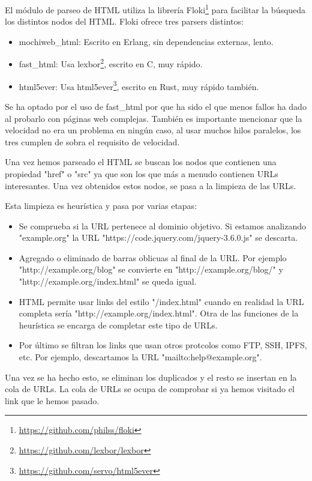 El módulo de parseo de HTML utiliza la librería Floki\footnote{\url{https://github.com/philss/floki}} para facilitar la búsqueda los distintos nodos del HTML. Floki ofrece tres parsers distintos:

\begin{itemize}
  \item mochiweb\_html: Escrito en Erlang, sin dependencias externas, lento.
  \item fast\_html: Usa lexbor\footnote{\url{https://github.com/lexbor/lexbor}}, escrito en C, muy rápido.
  \item html5ever: Usa html5ever\footnote{\url{https://github.com/servo/html5ever}}, escrito en Rust, muy rápido también.
\end{itemize}

Se ha optado por el uso de fast\_html por que ha sido el que menos fallos ha dado al probarlo con páginas web complejas. También es importante mencionar que la velocidad no era un problema en ningún caso, al usar muchos hilos paralelos, los tres cumplen de sobra el requisito de velocidad.

Una vez hemos parseado el HTML se buscan los nodos que contienen una propiedad "href" o "src" ya que son los que más a menudo contienen URLs interesantes. Una vez obtenidos estos nodos, se pasa a la limpieza de las URLs.

Esta limpieza es heurística y pasa por varias etapas:

\begin{itemize}
  \item Se comprueba si la URL pertenece al dominio objetivo. Si estamos analizando "example.org" la URL "https://code.jquery.com/jquery-3.6.0.js" se descarta.
  \item Agregado o eliminado de barras oblicuas al final de la URL. Por ejemplo "http://example.org/blog" se convierte en "http://example.org/blog/" y "http://example.org/index.html" se queda igual. 
  \item HTML permite usar links del estilo "/index.html" cuando en realidad la URL completa sería "http://example.org/index.html". Otra de las funciones de la heurística se encarga de completar este tipo de URLs.
  \item Por último se filtran los links que usan otros protcolos como FTP, SSH, IPFS, etc. Por ejemplo, descartamos la URL "mailto:help@example.org".
\end{itemize}

Una vez se ha hecho esto, se eliminan los duplicados y el resto se insertan en la cola de URLs. La cola de URLs se ocupa de comprobar si ya hemos visitado el link que le hemos pasado.